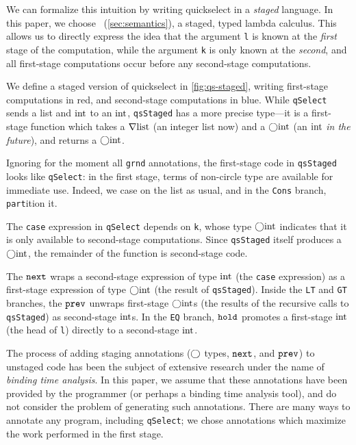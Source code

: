 \begin{abstrsyn}
We can formalize this intuition by writing quickselect in a \emph{staged}
language. In this paper, we choose \lang\ (\ref{sec:semantics}), a staged, typed
lambda calculus. This allows us to directly express the idea that the argument
\texttt{l} is known at the \emph{first} stage of the computation, while the
argument \texttt{k} is only known at the \emph{second}, and all
first-stage computations occur before any second-stage computations.

We define a staged version of quickselect in \ref{fig:qs-staged}, writing
first-stage computations in red, and second-stage computations in blue. While
\texttt{qSelect} sends a \textrm{list} and ${\rm int}$ to an ${\rm int}$,
\texttt{qsStaged} has a more precise type---it is a first-stage function which
takes a $\nabla\mathrm{list}$ (an integer list now) and a $\bigcirc{\rm int}$
(an ${\rm int}$ \emph{in the future}), and returns a $\bigcirc{\rm int}$.

Ignoring for the moment all \texttt{grnd} annotations, the first-stage code in
\texttt{qsStaged} looks like \texttt{qSelect}: in the first stage, terms of
non-circle type are available for immediate use. Indeed, we case on the list as
usual, and in the \texttt{Cons} branch, \texttt{part}ition it.

The \texttt{case} expression in \texttt{qSelect} depends on \texttt{k}, whose
type $\bigcirc{\rm int}$ indicates that it is only available to second-stage
computations. Since \texttt{qsStaged} itself produces a $\bigcirc{\rm int}$, the
remainder of the function is second-stage code.

The ${\tt next}$ wraps a second-stage expression of type ${\rm int}$ (the \texttt{case}
expression) as a first-stage expression of type $\bigcirc{\rm int}$ (the result 
of \texttt{qsStaged}). Inside the \texttt{LT} and \texttt{GT} branches, the
${\tt prev}$ unwraps first-stage $\bigcirc{\rm int}$s (the results of the recursive calls
to \texttt{qsStaged}) as second-stage ${\rm int}$s. In the \texttt{EQ} branch,
${\tt hold}$ promotes a first-stage ${\rm int}$ (the head of \texttt{l}) directly to a
second-stage ${\rm int}$.

The process of adding staging annotations ($\bigcirc$ types, ${\tt next}$, and ${\tt prev}$)
to unstaged code has been the subject of extensive research under the
name of \emph{binding time analysis}. In this paper, we assume that these
annotations have been provided by the programmer (or perhaps a binding time
analysis tool), and do not consider the problem of generating such annotations.
There are many ways to annotate any program, including \texttt{qSelect}; we
chose annotations which maximize the work performed in the first stage.


\end{abstrsyn}
